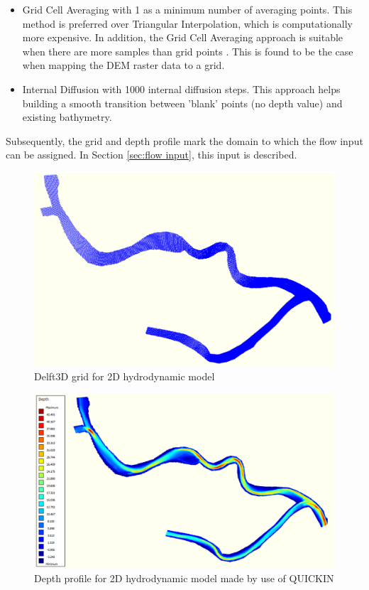 \begin{itemize}
    \item Grid Cell Averaging with 1 as a minimum number of averaging points. This method is preferred over Triangular Interpolation, which is computationally more expensive. In addition, the Grid Cell Averaging approach is suitable when there are more samples than grid points \autocite{deltaresQUICKINUserManual2025}. This is found to be the case when mapping the DEM raster data to a grid. 
    \item Internal Diffusion with 1000 internal diffusion steps. This approach helps building a smooth transition between 'blank' points (no depth value) and existing bathymetry. 
\end{itemize}

Subsequently, the grid and depth profile mark the domain to which the flow input can be assigned. In Section \ref{sec:flow input}, this input is described. 


\begin{figure}[H]
    \centering
    \includegraphics[width=0.5\linewidth]{figures/ch7/delftgrid.PNG}
    \caption{Delft3D grid for 2D hydrodynamic model}
    \label{fig:delftgrid}
\end{figure}

\begin{figure}[H]
    \centering
    \includegraphics[width=0.5\linewidth]{figures/ch7/depthprofile.PNG}
    \caption{Depth profile for 2D hydrodynamic model made by use of QUICKIN}
    \label{fig:depthprofile}
\end{figure}



